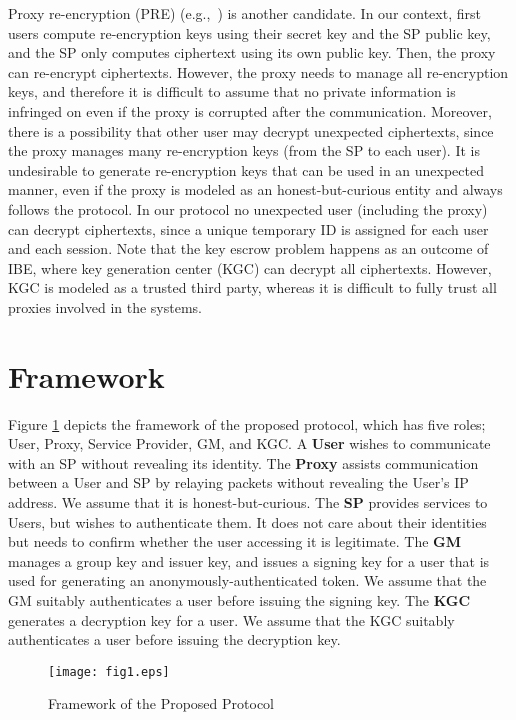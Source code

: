 \documentclass[preprint]{sig-alternate}
\begin{document}
Proxy re-encryption (PRE) (e.g.,~\cite{[LibertV11]}) 
is another candidate. 
In our context, first users compute re-encryption keys using their secret key and the SP public key, and the SP only computes ciphertext using its own public key. Then, the proxy can re-encrypt ciphertexts. 
However, the proxy needs to manage all re-encryption keys, and therefore it is difficult to assume that no private information is infringed on even if the proxy is corrupted after the communication. Moreover, there is a possibility that other user may decrypt unexpected ciphertexts, since the proxy manages many re-encryption keys (from the SP to each user). 
It is undesirable to generate re-encryption keys that can be used in an unexpected manner, even if the proxy is modeled as an honest-but-curious entity and always follows the protocol. 
In our protocol no unexpected user (including the proxy) can decrypt ciphertexts, since a unique temporary ID is assigned for each user and each session. Note that the key escrow problem happens as an outcome of IBE, where key generation center (KGC) can decrypt all ciphertexts. However, KGC is modeled as a trusted third party, whereas it is difficult to fully trust all proxies involved in the systems. 





\section{Framework}

Figure \ref{fig1.eps} depicts the framework of the proposed protocol, 
which has five roles; User, Proxy, Service Provider, GM, and KGC.
A {\bf User} wishes to communicate with an SP without revealing its identity.
The {\bf Proxy} assists communication between a User and SP by relaying packets without revealing the User's IP address.
We assume that it is honest-but-curious.
The {\bf SP} provides services to Users, but wishes to authenticate them.
It does not care about their identities but needs to confirm whether the user accessing it is legitimate.
The {\bf GM} manages a group key and issuer key, and issues a signing key for a user that is used for generating an anonymously-authenticated token.
We assume that the GM suitably authenticates a user before issuing the signing key. 
The {\bf KGC} generates a decryption key for a user. 
We assume that the KGC suitably authenticates a user before issuing the decryption key. 

\begin{figure}[t]
\centering
{\texttt{[image: fig1.eps]}}
\caption{Framework of the Proposed Protocol}\label{fig1.eps}
\end{figure}
\end{document}
